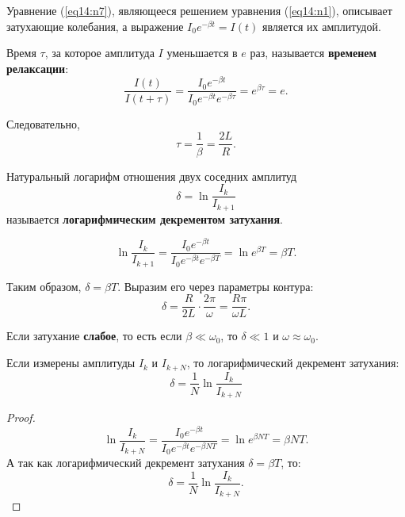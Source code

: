 \begin{enumerate}
            Уравнение (\ref{eq14:n7}), являющееся решением уравнения
            (\ref{eq14:n1}), описывает затухающие колебания, а выражение
            \( I_0e^{-\beta t} = I(t) \) является их амплитудой.
        
            \begin{definition}
                Время \( \tau \), за которое амплитуда \( I \) уменьшается в
                \( e \) раз, называется \textbf{временем релаксации}:
                \[
                    \frac{I(t)}{I(t + \tau)} = 
                    \frac{I_0e^{-\beta t}}{I_0e^{-\beta t}e^{-\beta\tau}} =
                    e^{\beta\tau} = e.
                \]
        
                Следовательно,
                \[
                    \tau = \frac{1}{\beta} = \frac{2L}{R}.
                \]
            \end{definition}
        
            \begin{definition}
                Натуральный логарифм отношения двух соседних амплитуд
                \[
                    \delta = \ln\frac{I_k}{I_{k + 1}}
                \]
                называется \textbf{логарифмическим декрементом затухания}.
            \end{definition}
        
            \[
                \ln\frac{I_k}{I_{k + 1}} =
                \frac{I_0e^{-\beta t}}{I_0e^{-\beta t}e^{-\beta T}} =
                \ln e^{\beta T} = \beta T.
            \]
        
            Таким образом, \( \delta = \beta T \). Выразим его через параметры
            контура:
            \[
                \delta = \frac{R}{2L}\cdot\frac{2\pi}{\omega} =
                \frac{R\pi}{\omega L}.
            \]
            
            Если затухание \textbf{слабое}, то есть если
            \( \beta \ll \omega_0 \), то \( \delta \ll 1 \) и
            \( \omega \approx \omega_0 \).
            
            \begin{remark}
                Если измерены амплитуды \( I_k \) и \( I_{k + N} \), то
                логарифмический декремент затухания:
                \[ \delta = \frac{1}{N}\ln\frac{I_k}{I_{k + N}} \]
            \end{remark}
            \begin{proof}
                \[
                    \ln\frac{I_k}{I_{k + N}} =
                    \frac{I_0e^{-\beta t}}{I_0e^{-\beta t}e^{-\beta NT}} =
                    \ln e^{\beta NT} = \beta NT.
                \]
                А так как логарифмический декремент затухания
                \( \delta = \beta T \), то:
                \[
                    \delta = \frac{1}{N}\ln\frac{I_k}{I_{k + N}}.
                \]
            \end{proof}
            

\end{enumerate}
